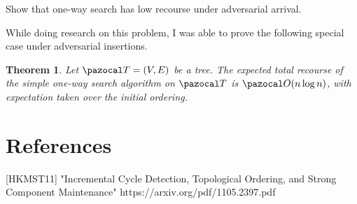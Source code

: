 \documentclass{article}
\newtheorem{theorem}{Theorem}[section]
\begin{document}
Show that one-way search has low recourse under adversarial arrival.

While doing research on this problem, I was able to prove the following special case under adversarial insertions.

\begin{theorem}
Let $\pazocal T = (V,E)$ be a tree. The expected total recourse of the simple one-way search algorithm on $\pazocal T$ is $\pazocal O(n \log n)$, with expectation taken over the initial ordering.
\end{theorem}

\section{References}

[HKMST11] "Incremental Cycle Detection, Topological Ordering, and Strong Component Maintenance" https://arxiv.org/pdf/1105.2397.pdf
\end{document}
